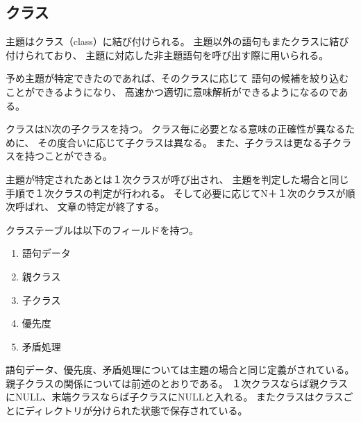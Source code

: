 \documentclass{jsarticle}
\begin{document}
\begin{multicols}{2}
\subsection{クラス}
主題はクラス（class）に結び付けられる。
主題以外の語句もまたクラスに結び付けられており、
主題に対応した非主題語句を呼び出す際に用いられる。

予め主題が特定できたのであれば、そのクラスに応じて
語句の候補を絞り込むことができるようになり、
高速かつ適切に意味解析ができるようになるのである。

クラスはN次の子クラスを持つ。
クラス毎に必要となる意味の正確性が異なるために、
その度合いに応じて子クラスは異なる。
また、子クラスは更なる子クラスを持つことができる。

主題が特定されたあとは１次クラスが呼び出され、
主題を判定した場合と同じ手順で１次クラスの判定が行われる。
そして必要に応じてN＋１次のクラスが順次呼ばれ、
文章の特定が終了する。

クラステーブルは以下のフィールドを持つ。
\begin{enumerate}
\item 語句データ
\item 親クラス
\item 子クラス
\item 優先度
\item 矛盾処理
\end{enumerate}
語句データ、優先度、矛盾処理については主題の場合と同じ定義がされている。
親子クラスの関係については前述のとおりである。
１次クラスならば親クラスにNULL、末端クラスならば子クラスにNULLと入れる。
またクラスはクラスごとにディレクトリが分けられた状態で保存されている。



\end{multicols}
\end{document}
